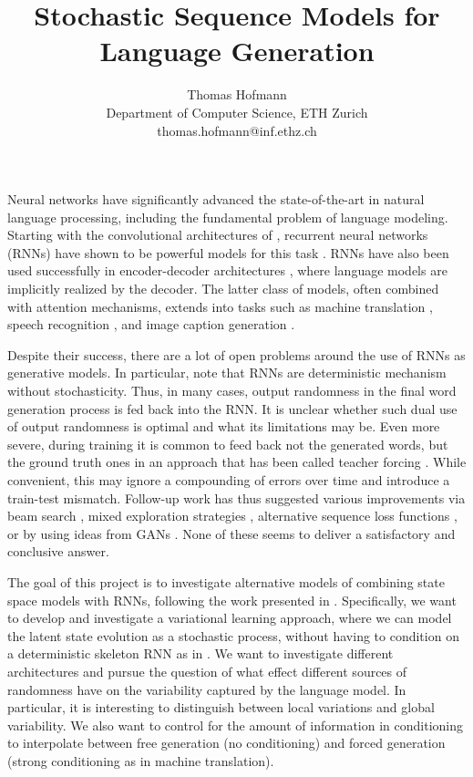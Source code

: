 \documentclass{article}
\title{
	Stochastic Sequence Models for Language Generation
}
\author{
	Thomas Hofmann \\[1mm] Department of Computer Science, ETH Zurich \\ thomas.hofmann@inf.ethz.ch
}
\begin{document}
\maketitle 

Neural networks have significantly advanced the state-of-the-art  in natural language processing, including the fundamental problem of language modeling. Starting with the convolutional architectures of \cite{bengio2003neural,schwenk2007continuous}, recurrent neural networks (RNNs) have shown to be powerful models for this task \cite{mikolov2010recurrent,jozefowicz2016exploring}. RNNs have also been used successfully in  encoder-decoder architectures \cite{sutskever2014sequence}, where language models are implicitly realized by the decoder. The latter class of models, often combined with attention mechanisms, extends into tasks such as machine translation \cite{luong2015effective}, speech recognition \cite{chorowski2015attention}, and image caption generation \cite{vinyals2015show,xu2015show}.

Despite their success, there are a lot of open problems  around the use of RNNs as generative models. In particular, note that RNNs are deterministic mechanism without stochasticity. Thus, in many cases, output randomness in the final word generation process is fed back into the RNN. It is unclear whether such dual use of output randomness is optimal and what its limitations may be. Even more severe, during training it is common to feed back not the generated words, but the ground truth ones in an approach that has been called teacher forcing \cite{williams1989learning, sutskever2014sequence}. While convenient, this may ignore a compounding of errors over time \cite{ranzato2015sequence} and introduce a train-test mismatch. Follow-up work has thus suggested various improvements via beam search \cite{wiseman2016sequence}, mixed exploration strategies \cite{bengio2015scheduled}, alternative sequence loss functions \cite{ranzato2015sequence}, or by using ideas from GANs  \cite{lamb2016professor}. None of these seems to deliver a satisfactory and conclusive answer. 

The goal of this project is to investigate alternative models of combining state space models with RNNs, following the work presented in \cite{fraccaro2016sequential}. Specifically, we want to develop and investigate a variational learning approach, where we can model the latent state evolution as a stochastic process, without having to condition on a deterministic skeleton RNN as in \cite{chung2015recurrent,fraccaro2016sequential}. We want to investigate different architectures and pursue the question of what effect different sources of randomness have on the variability captured by the language model. In particular, it is interesting to distinguish between local variations and global variability. We also want to control for the amount of information in conditioning to interpolate between free generation (no conditioning) and forced generation (strong conditioning as in machine translation). 
\newpage



\end{document}
